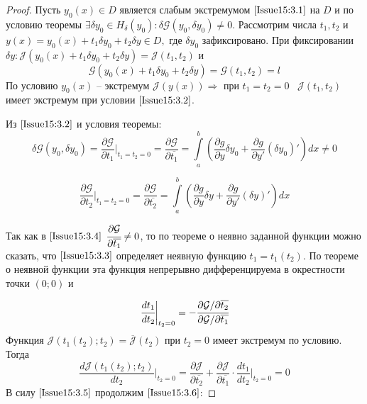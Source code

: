 \begin{proof}
	Пусть $y_0(x)\in D$ является слабым экстремумом $\eqref{Issue15:3.1}$ на $D$ и по условию теоремы $\exists \delta y_0\in H_\delta(y_0): \delta\mathcal{G}(y_0,\delta y_0)\neq 0$. Рассмотрим числа $t_1, t_2$ и $y(x)=y_0(x)+t_1\delta y_0 + t_2 \delta y \in D,$ где $\delta y_0$ зафиксировано. При фиксировании $\delta y: \mathcal{J}(y_0(x)+t_1\delta y_0+t_2 \delta y)=\mathcal{J}(t_1,t_2)$ и \begin{equation}
		\label{Issue15:3.3}
		\mathcal{G}(y_0(x)+t_1\delta y_0+t_2 \delta y)=\mathcal{G}(t_1,t_2)=l
	\end{equation}
	По условию $y_0(x)$ -- экстремум $\mathcal{J}(y(x))\Rightarrow$ при $t_1=t_2=0\;\;\;\mathcal{J}(t_1,t_2)$ имеет экстремум при условии $\eqref{Issue15:3.2}$.

Из $\eqref{Issue15:3.2}$ и условия теоремы: 
$$\delta \mathcal{G}(y_0,\delta y_0)=\frac{\partial \mathcal{G}}{\partial t_1} \bigg|_{t_1=t_2=0} = \frac{\partial \mathcal{G}}{\partial\overline{t_1}} = \int\limits_a^b \left( \frac{\partial g}{\partial y}\delta y_0+\frac{\partial g}{\partial y'}(\delta y_0)' \right) dx \neq 0$$

\begin{equation}
	\frac{\partial \mathcal{G}}{\partial t_2} \bigg|_{t_1 = t_2 = 0} = \frac{\partial \mathcal{G}}{\partial\overline{t_2}} = \int\limits_a^b \left( \frac{\partial g}{\partial y}\delta y+\frac{\partial g}{\partial y'}(\delta y)' \right) dx
	\label{Issue15:3.4}
\end{equation}

Так как в $\eqref{Issue15:3.4}$ $\cfrac{\partial \mathcal{G}}{\partial \overline{t_1}}\neq 0$, то по теореме о неявно заданной функции можно сказать, что $\eqref{Issue15:3.3}$ определяет неявную функцию $t_1=t_1(t_2)$. По теореме о неявной функции эта функция непрерывно дифференцируема в окрестности точки $(0;0)$ и 

\begin{equation}
    \cfrac{dt_1}{dt_2}\bigg|_{t_2 = 0} = -\cfrac{\partial \mathcal{G}/\partial \overline{t_2}}{\partial \mathcal{G}/\partial \overline{t_1}}
    \label{Issue15:3.5}
\end{equation}
Функция $\mathcal{J}(t_1(t_2);t_2)=\overline{\mathcal{J}}(t_2)$ при $t_2=0$ имеет экстремум по условию. Тогда 
\begin{equation}
    \frac{d\mathcal{J}(t_1(t_2);t_2)}{dt_2} \bigg|_{t_2=0}=\frac{\partial \mathcal{J}}{\partial \overline{t_2}}+ \frac{\partial \mathcal{J}}{\partial \overline{t_1}}\cdot \frac{d t_1}{d t_2}\bigg|_{t_2=0}=0
    \label{Issue15:3.6}
\end{equation}
В силу $\eqref{Issue15:3.5}$ продолжим $\eqref{Issue15:3.6}$: 


\end{proof}

